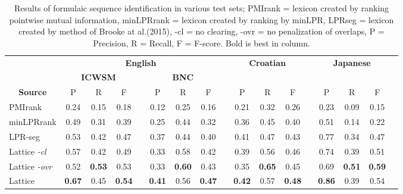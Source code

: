 \documentclass[11pt,letterpaper]{article}
\makeatletter
\def \al {al.\@ }
\makeatother
\begin{document}
 \begin{table}[!bt]
 
 \begin{center}
  \caption{ Results of formulaic sequence identification in various test sets; PMIrank = lexicon created by ranking pointwise mutual information, minLPRrank = lexicon created by ranking by minLPR, LPRseg = lexicon created by method of Brooke at \al (2015), -cl = no clearing, -ovr = no penalization of overlaps, P = Precision, R = Recall, F = F-score. Bold is best in column.}
	 \label{tab:main}
 \begin{tabular}{lcccccccccccccccc}

       \hline
        \hline
				& \multicolumn{7}{c}{\bf{English}} & & \multicolumn{3}{c}{\bf{Croatian}} & & \multicolumn{3}{c}{\bf{Japanese}} \\
       \cline{2-9}			
       & \multicolumn{3}{c}{\bf{ICWSM}} & &  \multicolumn{3}{c}{\bf{BNC}} & & &&&  && & \\
       \cline{2-4} \cline{6-8} \cline{10-12} \cline{14-16}
           \multicolumn{1}{c}{\bf{Source}}    & P & R & F &   & P & R & F &   & P & R & F &  & P & R & F \\
            \hline
           \hline     
           
PMIrank & 0.24& 0.15& 0.18 & & 0.12 & 0.25 & 0.16 & & 0.21 &0.32 & 0.26 & & 0.23& 0.09 & 0.15 \\ 
minLPRrank & 0.49& 0.31 & 0.39 & & 0.25& 0.44 & 0.32 & & 0.36 & 0.45 & 0.40 &  & 0.51 & 0.14 & 0.22 \\ 

LPR-seg  &0.53 & 0.42 & 0.47 && 0.37 & 0.44 & 0.40 & & 0.41 & 0.47  & 0.43 &  & 0.77 & 0.34 & 0.47 \\ 
  \hline 

	Lattice \emph{-cl} & 0.57& 0.42 & 0.49 & & 0.33& 0.58 & 0.42 & & 0.39 & 0.56 & 0.46 & & 0.74 & 0.39 & 0.51 \\  	 
			
	Lattice \emph{-ovr} & 0.52& \bf{0.53} & 0.53 & & 0.33& \bf{0.60} & 0.43& & 0.35 & \bf{0.65} & 0.45 & & 0.69 & \bf{0.51} & \bf{0.59} \\  
			
				Lattice & \bf{0.67} & 0.45 & \bf{0.54} & & \bf{0.41}& 0.56 & \bf{0.47} & &\bf{0.42} & 0.57 & \bf{0.48} & & \bf{0.86} & 0.39 & 0.54 \\ 
            \hline
           \hline                  

 \end{tabular}

 \end{center}


 \end{table}
\end{document}
